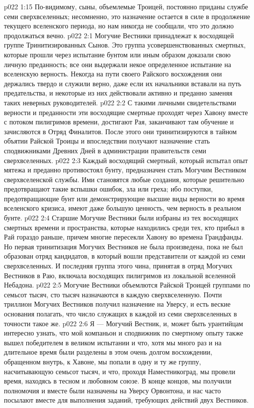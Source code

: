 \vs p022 1:15 По\hyp{}видимому, сыны, объемлемые Троицей, постоянно приданы службе семи сверхвселенных; несомненно, это назначение остается в силе в продолжение текущего вселенского периода, но нам никогда не сообщали, что это должно продолжаться вечно.
\vs p022 2:1 Могучие Вестники принадлежат к восходящей группе Тринитизированных Сынов. Это группа усовершенствованных смертных, которые прошли через испытание бунтом или иным образом доказали свою личную преданность; все они выдержали некое определенное испытание на вселенскую верность. Некогда на пути своего Райского восхождения они держались твердо и служили верно, даже если их начальники вставали на путь предательства, и некоторые из них действовали активно и преданно заменяя таких неверных руководителей.
\vs p022 2:2 С такими личными свидетельствами верности и преданности эти восходящие смертные проходят через Хавону вместе с потоком пилигримов времени, достигают Рая, заканчивают там обучение и зачисляются в Отряд Финалитов. После этого они тринитизируются в тайном объятии Райской Троицы и впоследствии получают назначение стать сподвижниками Древних Дней в администрации правительств семи сверхвселенных.
\vs p022 2:3 Каждый восходящий смертный, который испытал опыт мятежа и преданно противостоял бунту, предназначен стать Могучим Вестником сверхвселенской службы. Ими становятся любые создания, которые решительно предотвращают такие вспышки ошибок, зла или греха; ибо поступки, предотвращающие бунт или демонстрирующие высшие виды верности во время вселенского кризиса, имеют даже большую ценность, чем верность в реальном бунте.
\vs p022 2:4 Старшие Могучие Вестники были избраны из тех восходящих смертных времени и пространства, которые находились среди тех, кто прибыл в Рай гораздо раньше, причем многие пересекли Хавону во времена Грандфанды. Но первая тринитизация Могучих Вестников не была произведена, пока не был образован отряд кандидатов, в который вошли представители от каждой из семи сверхвселенных. И последняя группа этого чина, принятая в отряд Могучих Вестников в Раю, включала восходящих пилигримов из локальной вселенной Небадона.
\vs p022 2:5 Могучие Вестники объемлются Райской Троицей группами по семьсот тысяч, сто тысяч назначаются в каждую сверхвселенную. Почти триллион Могучих Вестников получил назначение на Уверсу, и есть веские основания полагать, что число служащих в каждой из семи сверхвселенных в точности такое же.
\vs p022 2:6 \pc Я --- Могучий Вестник, и, может быть урантийцам интересно узнать, что мой компаньон и сподвижник по смертному опыту также вышел победителем в великом испытании и что, хотя мы много раз и на длительное время были разделены в этом очень долгом восхождении, обращенном внутрь, к Хавоне, мы попали в одну и ту же группу, насчитывающую семьсот тысяч, и что, проходя Наместникоград, мы провели время, находясь в тесном и любовном союзе. В конце концов, мы получили полномочия и вместе были назначены на Уверсу Орвонтона, и нас часто посылают вместе для выполнения заданий, требующих действий двух Вестников.
